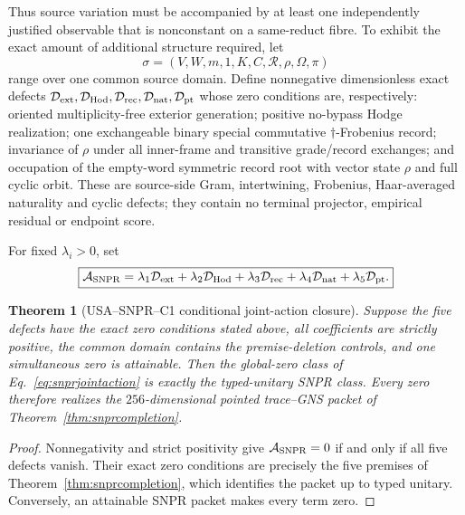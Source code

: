 \documentclass[11pt,a4paper]{article}
\newtheorem{theorem}[definition]{Theorem}
\theoremstyle{remark}
\begin{document}
Thus source variation must be accompanied by at least one independently
justified observable that is nonconstant on a same-reduct fibre.  To exhibit
the exact amount of additional structure required, let
\begin{equation}
 \sigma=(V,W,m,1,K,C,\mathcal R,\rho,\Omega,\pi)
 \label{eq:snprsourcepacket}
\end{equation}
range over one common source domain.  Define nonnegative dimensionless exact
defects $\mathcal D_{\rm ext},\mathcal D_{\rm Hod},\mathcal D_{\rm rec},
\mathcal D_{\rm nat},\mathcal D_{\rm pt}$ whose zero conditions are,
respectively: oriented multiplicity-free exterior generation; positive
no-bypass Hodge realization; one exchangeable binary special commutative
$\dagger$-Frobenius record; invariance of $\rho$ under all inner-frame and
transitive grade/record exchanges; and occupation of the empty-word symmetric
record root with vector state $\rho$ and full cyclic orbit.  These are
source-side Gram, intertwining, Frobenius, Haar-averaged naturality and cyclic
defects; they contain no terminal projector, empirical residual or endpoint
score.

For fixed $\lambda_i>0$, set
\begin{equation}
 \boxed{
 \mathcal A_{\rm SNPR}=
 \lambda_1\mathcal D_{\rm ext}
 +\lambda_2\mathcal D_{\rm Hod}
 +\lambda_3\mathcal D_{\rm rec}
 +\lambda_4\mathcal D_{\rm nat}
 +\lambda_5\mathcal D_{\rm pt}.}
 \label{eq:snprjointaction}
\end{equation}

\begin{theorem}[USA--SNPR--C1 conditional joint-action closure]
Suppose the five defects have the exact zero conditions stated above, all
coefficients are strictly positive, the common domain contains the
premise-deletion controls, and one simultaneous zero is attainable.  Then the
global-zero class of Eq.~\eqref{eq:snprjointaction} is exactly the typed-unitary
SNPR class.  Every zero therefore realizes the $256$-dimensional pointed
trace--GNS packet of Theorem~\ref{thm:snprcompletion}.
\label{thm:snprjointaction}
\end{theorem}

\begin{proof}
Nonnegativity and strict positivity give $\mathcal A_{\rm SNPR}=0$ if and only
if all five defects vanish.  Their exact zero conditions are precisely the
five premises of Theorem~\ref{thm:snprcompletion}, which identifies the packet
up to typed unitary.  Conversely, an attainable SNPR packet makes every term
zero.
\end{proof}
\end{document}
